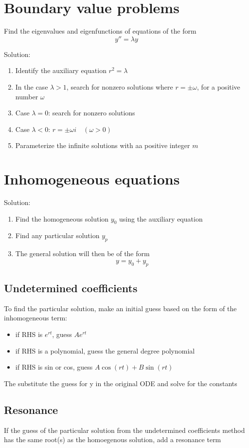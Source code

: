 \documentclass[12pt]{article}
\begin{document}
\section{Boundary value problems}
Find the eigenvalues and eigenfunctions of equations of the form
\[y'' = \lambda y\]

Solution:
\begin{enumerate}
    \item Identify the auxiliary equation $r^2 = \lambda$
    \item In the case $\lambda > 1$, search for nonzero solutions where $r = \pm \omega$, for a positive number $\omega$
    \item Case $\lambda = 0$: search for nonzero solutions
    \item Case $\lambda < 0$: $r = \pm \omega i \quad (\omega > 0)$
    \item Parameterize the infinite solutions with aa positive integer $m$
\end{enumerate}
\section{Inhomogeneous equations}
Solution:
\begin{enumerate}
    \item Find the homogeneous solution $y_0$ using the auxiliary equation
    \item Find any particular solution $y_p$
    \item The general solution will then be of the form
    \[\boxed{y = y_0 + y_p} \]
\end{enumerate}

\subsection*{Undetermined coefficients}
To find the particular solution, make an initial guess based on the form of the inhomogeneous term:
\begin{itemize}
    \item if RHS is $e^{rt}$, guess $Ae^{rt}$
    \item if RHS is a polynomial, guess the general degree polynomial
    \item if RHS is sin or cos, guess $A\cos(rt) + B\sin(rt)$
\end{itemize}

The substitute the guess for y in the original ODE and solve for the constants

\subsection*{Resonance}
If the guess of the particular solution from the undetermined coefficients method has the same root(s) as the homoegenous solution, add a resonance term
\end{document}
